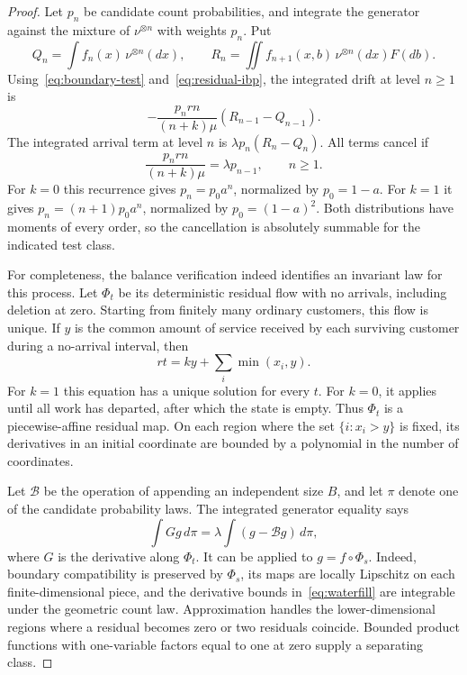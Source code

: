 \begin{proof}
Let $p_n$ be candidate count probabilities, and integrate the generator against the mixture of $\nu^{\otimes n}$ with weights $p_n$. Put
\[
 Q_n=\int f_n(x)\,\nu^{\otimes n}(dx),\qquad
 R_n=\iint f_{n+1}(x,b)\,\nu^{\otimes n}(dx)F(db).
\]
Using~\eqref{eq:boundary-test} and~\eqref{eq:residual-ibp}, the integrated drift at level $n\geq1$ is
\[
 -\frac{p_nrn}{(n+k)\mu}(R_{n-1}-Q_{n-1}).
\]
The integrated arrival term at level $n$ is $\lambda p_n(R_n-Q_n)$. All terms cancel if
\begin{equation}\label{eq:count-balance}
 \frac{p_nrn}{(n+k)\mu}=\lambda p_{n-1},\qquad n\geq1.
\end{equation}
For $k=0$ this recurrence gives $p_n=p_0a^n$, normalized by $p_0=1-a$. For $k=1$ it gives $p_n=(n+1)p_0a^n$, normalized by $p_0=(1-a)^2$. Both distributions have moments of every order, so the cancellation is absolutely summable for the indicated test class.

For completeness, the balance verification indeed identifies an invariant law for this process. Let $\Phi_t$ be its deterministic residual flow with no arrivals, including deletion at zero. Starting from finitely many ordinary customers, this flow is unique. If $y$ is the common amount of service received by each surviving customer during a no-arrival interval, then
\begin{equation}\label{eq:waterfill}
 rt=ky+\sum_i\min(x_i,y).
\end{equation}
For $k=1$ this equation has a unique solution for every $t$. For $k=0$, it applies until all work has departed, after which the state is empty. Thus $\Phi_t$ is a piecewise-affine residual map. On each region where the set $\{i:x_i>y\}$ is fixed, its derivatives in an initial coordinate are bounded by a polynomial in the number of coordinates.

Let $\mathcal B$ be the operation of appending an independent size $B$, and let $\pi$ denote one of the candidate probability laws. The integrated generator equality says
\[
 \int Gg\,d\pi=\lambda\int(g-\mathcal B g)\,d\pi,
\]
where $G$ is the derivative along $\Phi_t$. It can be applied to $g=f\circ\Phi_s$. Indeed, boundary compatibility is preserved by $\Phi_s$, its maps are locally Lipschitz on each finite-dimensional piece, and the derivative bounds in~\eqref{eq:waterfill} are integrable under the geometric count law. Approximation handles the lower-dimensional regions where a residual becomes zero or two residuals coincide. Bounded product functions with one-variable factors equal to one at zero supply a separating class.


\end{proof}
